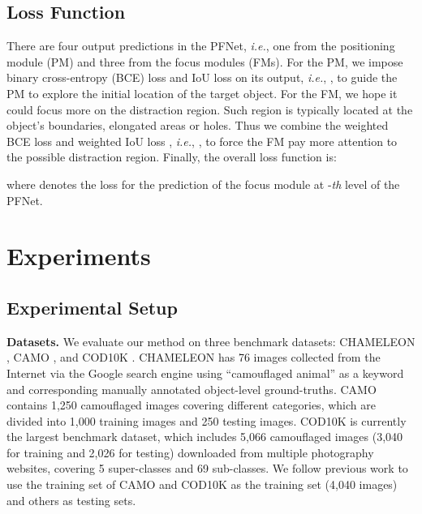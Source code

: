 \documentclass[final]{cvpr}
\begin{document}
\subsection{Loss Function}
There are four output predictions in the PFNet, \emph{i.e.}, one from the positioning module (PM) and three from the focus modules (FMs). For the PM, we impose binary cross-entropy (BCE) loss  and IoU loss  \cite{qin2019basnet} on its output, \emph{i.e.}, , to guide the PM to explore the initial location of the target object. For the FM, we hope it could focus more on the distraction region. Such region is typically located at the object's boundaries, elongated areas or holes. Thus we combine the weighted BCE loss  \cite{wei2019f3net} and weighted IoU loss  \cite{wei2019f3net}, \emph{i.e.}, , to force the FM pay more attention to the possible distraction region. Finally, the overall loss function is:

where  denotes the loss for the prediction of the focus module at -\emph{th} level of the PFNet.


\section{Experiments}
\subsection{Experimental Setup}
\textbf{Datasets.} We evaluate our method on three benchmark datasets: CHAMELEON \cite{skurowski2018animal_chameleon}, CAMO \cite{le2019anabranch_camo}, and COD10K \cite{Fan_2020_CVPR_sinet}. CHAMELEON \cite{skurowski2018animal_chameleon} has 76 images collected from the Internet via the Google search engine using ``camouflaged animal'' as a keyword and corresponding manually annotated object-level ground-truths. CAMO \cite{le2019anabranch_camo} contains 1,250 camouflaged images covering different categories, which are divided into 1,000 training images and 250 testing images. COD10K \cite{Fan_2020_CVPR_sinet} is currently the largest benchmark dataset, which includes 5,066 camouflaged images (3,040 for training and 2,026 for testing) downloaded from multiple photography websites, covering 5 super-classes and 69 sub-classes. We follow previous work \cite{Fan_2020_CVPR_sinet} to use the training set of CAMO \cite{le2019anabranch_camo} and COD10K \cite{Fan_2020_CVPR_sinet} as the training set (4,040 images) and others as testing sets.
\end{document}
